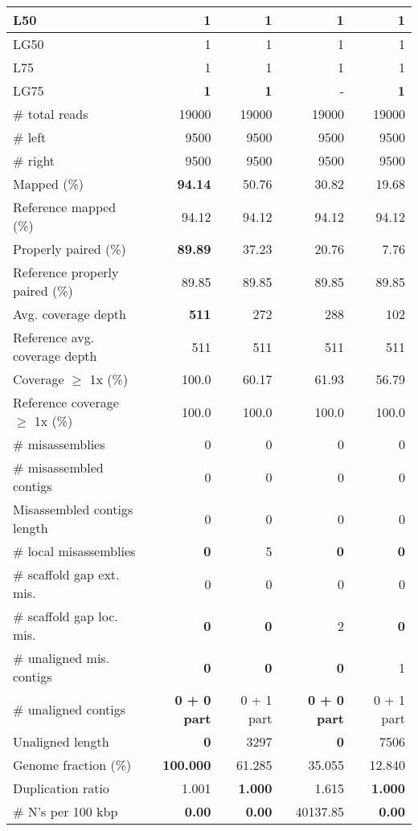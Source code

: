 \documentclass[12pt,a4paper]{article}
\begin{document}
\begin{table}[ht]
\begin{center}
\begin{tabular}{|l*{4}{|r}|}
L50 & 1 & 1 & 1 & 1 \\ \hline
LG50 & 1 & 1 & 1 & 1 \\ \hline
L75 & 1 & 1 & 1 & 1 \\ \hline
LG75 & {\bf 1} & {\bf 1} & - & {\bf 1} \\ \hline
\# total reads & 19000 & 19000 & 19000 & 19000 \\ \hline
\# left & 9500 & 9500 & 9500 & 9500 \\ \hline
\# right & 9500 & 9500 & 9500 & 9500 \\ \hline
Mapped (\%) & {\bf 94.14} & 50.76 & 30.82 & 19.68 \\ \hline
Reference mapped (\%) & 94.12 & 94.12 & 94.12 & 94.12 \\ \hline
Properly paired (\%) & {\bf 89.89} & 37.23 & 20.76 & 7.76 \\ \hline
Reference properly paired (\%) & 89.85 & 89.85 & 89.85 & 89.85 \\ \hline
Avg. coverage depth & {\bf 511} & 272 & 288 & 102 \\ \hline
Reference avg. coverage depth & 511 & 511 & 511 & 511 \\ \hline
Coverage $\geq$ 1x (\%) & 100.0 & 60.17 & 61.93 & 56.79 \\ \hline
Reference coverage $\geq$ 1x (\%) & 100.0 & 100.0 & 100.0 & 100.0 \\ \hline
\# misassemblies & 0 & 0 & 0 & 0 \\ \hline
\# misassembled contigs & 0 & 0 & 0 & 0 \\ \hline
Misassembled contigs length & 0 & 0 & 0 & 0 \\ \hline
\# local misassemblies & {\bf 0} & 5 & {\bf 0} & {\bf 0} \\ \hline
\# scaffold gap ext. mis. & 0 & 0 & 0 & 0 \\ \hline
\# scaffold gap loc. mis. & {\bf 0} & {\bf 0} & 2 & {\bf 0} \\ \hline
\# unaligned mis. contigs & {\bf 0} & {\bf 0} & {\bf 0} & 1 \\ \hline
\# unaligned contigs & {\bf 0 + 0 part} & 0 + 1 part & {\bf 0 + 0 part} & 0 + 1 part \\ \hline
Unaligned length & {\bf 0} & 3297 & {\bf 0} & 7506 \\ \hline
Genome fraction (\%) & {\bf 100.000} & 61.285 & 35.055 & 12.840 \\ \hline
Duplication ratio & 1.001 & {\bf 1.000} & 1.615 & {\bf 1.000} \\ \hline
\# N's per 100 kbp & {\bf 0.00} & {\bf 0.00} & 40137.85 & {\bf 0.00} \\ \hline

\end{tabular}
\end{center}
\end{table}
\end{document}
